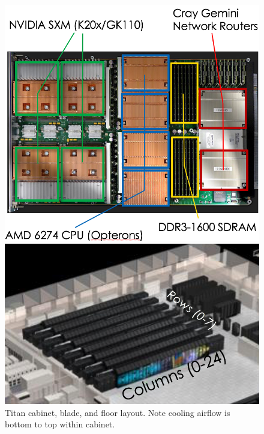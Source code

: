 \begin{figure}
\begin{minipage}{0.49\columnwidth}
  \end{minipage}
  \begin{minipage}{0.49\columnwidth}
    \includegraphics[width=\columnwidth]{figs/TitanBlade.png}
    
    \vspace{5em}
    \includegraphics[width=\columnwidth]{figs/TitanLayout.png}
  \end{minipage}
  \caption{Titan cabinet, blade, and floor layout. Note cooling
    airflow is bottom to top within cabinet.}
  \label{fig:layout}
\end{figure}


